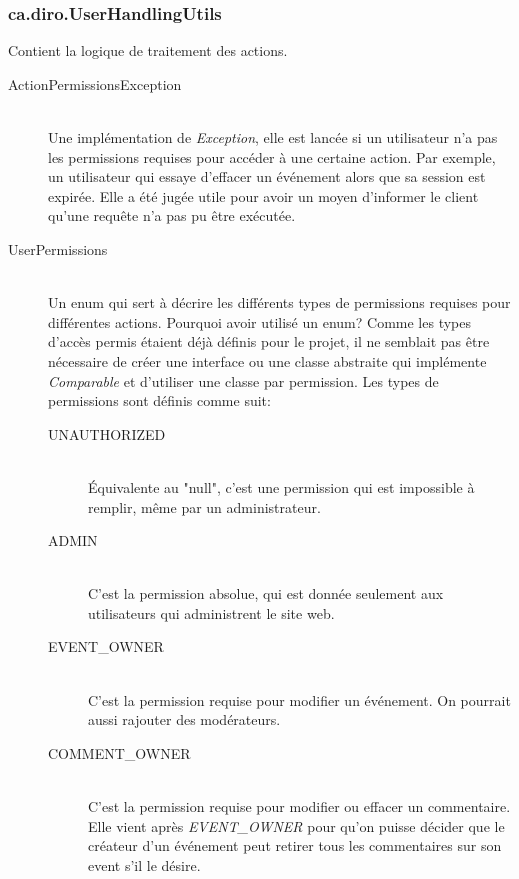 \documentclass[10pt,a4paper]{report}
\begin{document}
\begin{flushleft}
\subsubsection*{ca.diro.UserHandlingUtils}
Contient la logique de traitement des actions.\\
\bigskip
\begin{description}
\item[ActionPermissionsException] \hfill \\ Une implémentation de \emph{Exception}, elle est lancée si un utilisateur n'a pas les permissions requises pour accéder à une certaine action. Par exemple, un utilisateur qui essaye d'effacer un événement alors que sa session est expirée. Elle a été jugée utile pour avoir un moyen d'informer le client qu'une requête n'a pas pu être exécutée.\\
\item[UserPermissions] \hfill \\ Un enum qui sert à décrire les différents types de permissions requises pour différentes actions. Pourquoi avoir utilisé un enum? Comme les types d'accès permis étaient déjà définis pour le projet, il ne semblait pas être nécessaire de créer une interface ou une classe abstraite qui implémente \emph{Comparable} et d'utiliser une classe par permission. Les types de permissions sont définis comme suit:\\
\bigskip
\begin{description}
\item[UNAUTHORIZED] \hfill \\ Équivalente au "null", c'est une permission qui est impossible à remplir, même par un administrateur.\\
\item[ADMIN] \hfill \\ C'est la permission absolue, qui est donnée seulement aux utilisateurs qui administrent le site web.\\
\item[EVENT\_OWNER] \hfill \\ C'est la permission requise pour modifier un événement. On pourrait aussi rajouter des modérateurs.\\
\item[COMMENT\_OWNER] \hfill \\ C'est la permission requise pour modifier ou effacer un commentaire. Elle vient après \emph{EVENT\_OWNER} pour qu'on puisse décider que le créateur d'un événement peut retirer tous les commentaires sur son event s'il le désire.\\

\end{description}
\end{description}
\end{flushleft}
\end{document}
